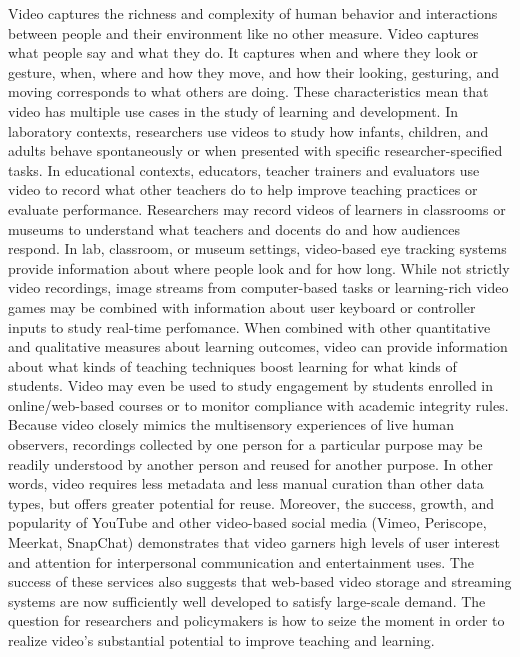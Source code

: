 \documentclass[letterpaper,man,natbib]{apa6}
\begin{document}
Video captures the richness and complexity of human behavior and interactions between people and their environment like no other measure.
Video captures what people say and what they do.
It captures when and where they look or gesture, when, where and how they move, and how their looking, gesturing, and moving corresponds to what others are doing.
These characteristics mean that video has multiple use cases in the study of learning and development.
In laboratory contexts, researchers use videos to study how infants, children, and adults behave spontaneously or when presented with specific researcher-specified tasks.
In educational contexts, educators, teacher trainers and evaluators use video to record what other teachers do to help improve teaching practices or evaluate performance.
Researchers may record videos of learners in classrooms or museums to understand what teachers and docents do and how audiences respond.
In lab, classroom, or museum settings, video-based eye tracking systems provide information about where people look and for how long.
While not strictly video recordings, image streams from computer-based tasks or learning-rich video games may be combined with information about user keyboard or controller inputs to study real-time perfomance.
When combined with other quantitative and qualitative measures about learning outcomes, video can provide information about what kinds of teaching techniques boost learning for what kinds of students.
Video may even be used to study engagement by students enrolled in online/web-based courses or to monitor compliance with academic integrity rules.
Because video closely mimics the multisensory experiences of live human observers, recordings collected by one person for a particular purpose may be readily understood by another person and reused for another purpose.
In other words, video requires less metadata and less manual curation than other data types, but offers greater potential for reuse.
Moreover, the success, growth, and popularity of YouTube and other video-based social media (Vimeo, Periscope, Meerkat, SnapChat) demonstrates that video garners high levels of user interest and attention for interpersonal communication and entertainment uses.
The success of these services also suggests that web-based video storage and streaming systems are now sufficiently well developed to satisfy large-scale demand.
The question for researchers and policymakers is how to seize the moment in order to realize video's substantial potential to improve teaching and learning. 
\end{document}
